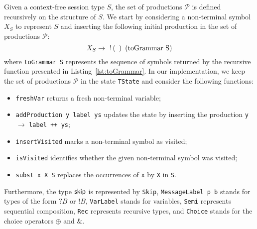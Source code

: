 Given a context-free session type $S$, the set of productions $\mathcal{P}$
is defined recursively on the structure of $S$. We start by considering 
a non-terminal symbol $X_S$ to represent $S$ and inserting the following 
initial production in the set of productions $\mathcal{P}$: 
\begin{equation}
\label{initial_prod}
	X_S \rightarrow \enspace \initialProd\enspace \text{(\lstinline{toGrammar S})}	
\end{equation}
where \lstinline{toGrammar S} represents the sequence of symbols returned by the
recursive function presented in Listing~\ref{lst:toGrammar}. In our implementation, 
we keep the set of productions $\mathcal{P}$ in the state \lstinline{TState}
and consider the following functions:
\begin{itemize}
	\item \lstinline{freshVar} returns a fresh non-terminal variable;
	\item \lstinline{addProduction y label ys} updates the state by inserting 
	      the production \lstinline{y} $\rightarrow$ \lstinline{label ++ ys};
	\item \lstinline{insertVisited} marks a non-terminal symbol as visited;
	\item \lstinline{isVisited} identifies whether the given non-terminal symbol 
	      was visited;
	\item \lstinline{subst x X S} replaces the occurrences of \lstinline{x} by 
	      \lstinline{X} in \lstinline{S}.
\end{itemize}
Furthermore, the type $\mathsf{skip}$ is represented by \lstinline{Skip}, 
\lstinline{MessageLabel p b} stands for types of the form $?B$ or $!B$,
\lstinline{VarLabel} stands for variables, 
\lstinline{Semi} represents sequential composition,
\lstinline{Rec} represents recursive types, and
\lstinline{Choice} stands for the choice operators $\oplus$ and $\&$.

